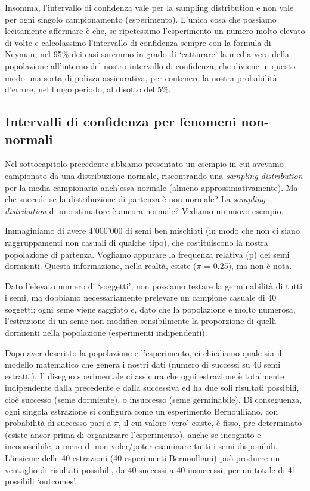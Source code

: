 \documentclass[a4paper,12pt,oneside]{book}
\begin{document}
Insomma, l'intervallo di confidenza vale per la sampling distribution e non vale per ogni singolo campionamento (esperimento). L'unica cosa che possiamo lecitamente affermare è che, se ripetessimo l'esperimento un numero molto elevato di volte e calcolassimo l'intervallo di confidenza sempre con la formula di Neyman, nel 95\% dei casi saremmo in grado di `catturare' la media vera della popolazione all'interno del nostro intervallo di confidenza, che diviene in questo modo una sorta di polizza assicurativa, per contenere la nostra probabilità d'errore, nel lungo periodo, al disotto del 5\%.

\hypertarget{intervalli-di-confidenza-per-fenomeni-non-normali}{%
\subsection{Intervalli di confidenza per fenomeni non-normali}\label{intervalli-di-confidenza-per-fenomeni-non-normali}}

Nel sottocapitolo precedente abbiamo presentato un esempio in cui avevamo campionato da una distribuzione normale, riscontrando una \emph{sampling distribution} per la media campionaria anch'essa normale (almeno approssimativamente). Ma che succede se la distribuzione di partenza è non-normale? La \emph{sampling distribution} di uno stimatore è ancora normale? Vediamo un nuovo esempio.

Immaginiamo di avere 4'000'000 di semi ben mischiati (in modo che non ci siano raggruppamenti non casuali di qualche tipo), che costituiscono la nostra popolazione di partenza. Vogliamo appurare la frequenza relativa (p) dei semi dormienti. Questa informazione, nella realtà, esiste (\(\pi\) = 0.25), ma non è nota.

Dato l'elevato numero di `soggetti', non possiamo testare la germinabilità di tutti i semi, ma dobbiamo necessariamente prelevare un campione casuale di 40 soggetti; ogni seme viene saggiato e, dato che la popolazione è molto numerosa, l'estrazione di un seme non modifica sensibilmente la proporzione di quelli dormienti nella popolazione (esperimenti indipendenti).

Dopo aver descritto la popolazione e l'esperimento, ci chiediamo quale sia il modello matematico che genera i nostri dati (numero di successi su 40 semi estratti). Il disegno sperimentale ci assicura che ogni estrazione è totalmente indipendente dalla precedente e dalla successiva ed ha due soli risultati possibili, cioè successo (seme dormiente), o insuccesso (seme germinabile). Di conseguenza, ogni singola estrazione si configura come un esperimento Bernoulliano, con probabilità di successo pari a \(\pi\), il cui valore `vero' esiste, è fisso, pre-determinato (esiste ancor prima di organizzare l'esperimento), anche se incognito e inconoscibile, a meno di non voler/poter esaminare tutti i semi disponibili. L'insieme delle 40 estrazioni (40 esperimenti Bernoulliani) può produrre un ventaglio di risultati possibili, da 40 successi a 40 insuccessi, per un totale di 41 possibili `outcomes'.
\end{document}
